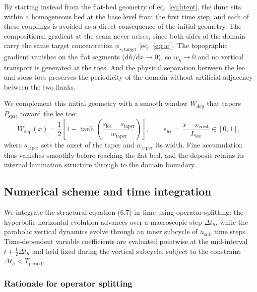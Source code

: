 \documentclass[lineno]{JFM-FLM_Au}
\begin{document}
By starting instead from the flat-bed geometry of eq.~\eqref{eq:htent}, the dune sits within a homogeneous bed at the base level from the first time step, and each of these couplings is avoided as a direct consequence of the initial geometry. The compositional gradient at the seam never arises, since both sides of the domain carry the same target concentration $\phi_{s,\mathrm{target}}$ [eq.~\eqref{eq:ic}]. The topographic gradient vanishes on the flat segments ($\mathrm{d}h/\mathrm{d}x \to 0$), so $w_\eta \to 0$ and no vertical transport is generated at the toes. And the physical separation between the lee and stoss toes preserves the periodicity of the domain without artificial adjacency between the two flanks.

We complement this initial geometry with a smooth window $W_{\mathrm{dep}}$ that tapers $P_{\mathrm{spat}}$ toward the lee toe:
\begin{equation}
    W_{\mathrm{dep}}(x) = \frac{1}{2}\left[1 - \tanh\!\left(\frac{s_{\mathrm{lee}}-s_{\mathrm{taper}}}{w_{\mathrm{taper}}}\right)\right], \qquad
    s_{\mathrm{lee}} = \frac{x-x_{\mathrm{crest}}}{L_{\mathrm{lee}}} \in [0,1],
    \label{eq:Wdep}
\end{equation}
where $s_{\mathrm{taper}}$ sets the onset of the taper and $w_{\mathrm{taper}}$ its width. Fine accumulation thus vanishes smoothly before reaching the flat bed, and the deposit retains its internal lamination structure through to the domain boundary.

\subsection{Numerical scheme and time integration}
\label{sec:numscheme}

We integrate the structural equation (6.7) in time using operator splitting: the hyperbolic horizontal evolution advances over a macroscopic step $\Delta t_h$, while the parabolic vertical dynamics evolve through an inner subcycle of $n_{\mathrm{sub}}$ time steps. Time-dependent variable coefficients are evaluated pointwise at the mid-interval $t + \frac{1}{2}\Delta t_h$ and held fixed during the vertical subcycle, subject to the constraint $\Delta t_h < T_{\mathrm{period}}$.

\subsubsection{Rationale for operator splitting}
\label{sec:splitting}
\end{document}
